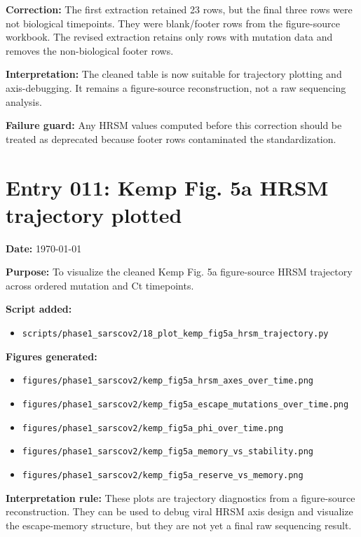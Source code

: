 \textbf{Correction:} The first extraction retained 23 rows, but the final three rows were not biological timepoints. They were blank/footer rows from the figure-source workbook. The revised extraction retains only rows with mutation data and removes the non-biological footer rows.

\textbf{Interpretation:} The cleaned table is now suitable for trajectory plotting and axis-debugging. It remains a figure-source reconstruction, not a raw sequencing analysis.

\textbf{Failure guard:} Any HRSM values computed before this correction should be treated as deprecated because footer rows contaminated the standardization.


\section*{Entry 011: Kemp Fig. 5a HRSM trajectory plotted}

\textbf{Date:} \today

\textbf{Purpose:} To visualize the cleaned Kemp Fig. 5a figure-source HRSM trajectory across ordered mutation and Ct timepoints.

\textbf{Script added:}
\begin{itemize}
    \item \texttt{scripts/phase1\_sarscov2/18\_plot\_kemp\_fig5a\_hrsm\_trajectory.py}
\end{itemize}

\textbf{Figures generated:}
\begin{itemize}
    \item \texttt{figures/phase1\_sarscov2/kemp\_fig5a\_hrsm\_axes\_over\_time.png}
    \item \texttt{figures/phase1\_sarscov2/kemp\_fig5a\_escape\_mutations\_over\_time.png}
    \item \texttt{figures/phase1\_sarscov2/kemp\_fig5a\_phi\_over\_time.png}
    \item \texttt{figures/phase1\_sarscov2/kemp\_fig5a\_memory\_vs\_stability.png}
    \item \texttt{figures/phase1\_sarscov2/kemp\_fig5a\_reserve\_vs\_memory.png}
\end{itemize}

\textbf{Interpretation rule:} These plots are trajectory diagnostics from a figure-source reconstruction. They can be used to debug viral HRSM axis design and visualize the escape-memory structure, but they are not yet a final raw sequencing result.

